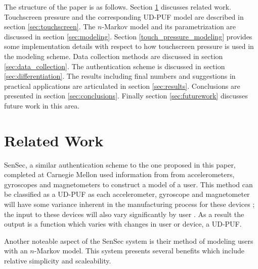 \documentclass{acm_proc_article-sp}
\begin{document}
The structure of the paper is as follows. Section \ref{sec:related_work} discusses related work. Touchscreen pressure and the corresponding UD-PUF model are described in section \ref{sec:touchscreen}. The $n$-Markov model and its parametrization are discussed in section \ref{sec:modeling}. Section \ref{touch_pressure_modeling} provides some implementation details with respect to how touchscreen pressure is used in the modeling scheme. Data collection methods are discussed in section \ref{sec:data_collection}. The authentication scheme is discussed in section \ref{sec:differentiation}. The results including final numbers and suggestions in practical applications are articulated in section \ref{sec:results}. Conclusions are presented in section \ref{sec:conclusions}. Finally section \ref{sec:futurework} discusses future work in this area. 

\section{Related Work}
\label{sec:related_work}
SenSec, a similar authentication scheme to the one proposed in this paper, completed at Carnegie Mellon used information from from accelerometers, gyroscopes and magnetometers to construct a model of a user. \cite{zhu2013sensec} This method can be classified as a UD-PUF as each accelerometer, gyroscope and magnetometer will have some variance inherent in the manufacturing process for these devices \cite{?}; the input to these devices will also vary significantly by user \cite{?}. As a result the output is a function which varies with changes in user or device, a UD-PUF.

Another noteable aspect of the SenSec system is their method of modeling users with an $n$-Markov model. This system presents several benefits which include relative simplicity and scaleability. \cite{zhu2013sensec} 

\cite{shi2011senguard}
\cite{feng2012continuous}


\end{document}

